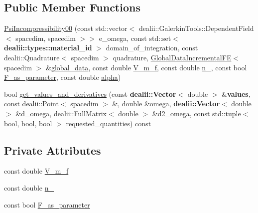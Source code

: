 \subsection*{Public Member Functions}
\begin{DoxyCompactItemize}
\item 
\hyperlink{classincremental_f_e_1_1_psi_incompressibility00_af5f686a8e2cf7aeb51ca959de9e32cb9}{Psi\+Incompressibility00} (const std\+::vector$<$ dealii\+::\+Galerkin\+Tools\+::\+Dependent\+Field$<$ spacedim, spacedim $>$$>$ e\+\_\+omega, const std\+::set$<$ {\bf dealii\+::types\+::material\+\_\+id} $>$ domain\+\_\+of\+\_\+integration, const dealii\+::\+Quadrature$<$ spacedim $>$ quadrature, \hyperlink{classincremental_f_e_1_1_global_data_incremental_f_e}{Global\+Data\+Incremental\+FE}$<$ spacedim $>$ \&\hyperlink{classincremental_f_e_1_1_psi_3_01spacedim_00_01spacedim_01_4_abf0a4804877fd7cc9bd1b90e52760ba9}{global\+\_\+data}, const double \hyperlink{classincremental_f_e_1_1_psi_incompressibility00_adb4a98d91d9105e56d71b1c2bbb731fe}{V\+\_\+m\+\_\+f}, const double \hyperlink{classincremental_f_e_1_1_psi_incompressibility00_a21e9fc511e9410d0fbc9d0514f801f69}{n\+\_}, const bool \hyperlink{classincremental_f_e_1_1_psi_incompressibility00_aca72a8996f35c7dbd664765af62dec95}{F\+\_\+as\+\_\+parameter}, const double \hyperlink{classincremental_f_e_1_1_psi_3_01spacedim_00_01spacedim_01_4_af7b8227188dbdd6ada35b9445d96c79d}{alpha})
\item 
bool \hyperlink{classincremental_f_e_1_1_psi_incompressibility00_a2a743cc84d7a5df0ac48b6ba52f15897}{get\+\_\+values\+\_\+and\+\_\+derivatives} (const {\bf dealii\+::\+Vector}$<$ double $>$ \&{\bf values}, const dealii\+::\+Point$<$ spacedim $>$ \&, double \&omega, {\bf dealii\+::\+Vector}$<$ double $>$ \&d\+\_\+omega, dealii\+::\+Full\+Matrix$<$ double $>$ \&d2\+\_\+omega, const std\+::tuple$<$ bool, bool, bool $>$ requested\+\_\+quantities) const 
\end{DoxyCompactItemize}
\subsection*{Private Attributes}
\begin{DoxyCompactItemize}
\item 
const double \hyperlink{classincremental_f_e_1_1_psi_incompressibility00_adb4a98d91d9105e56d71b1c2bbb731fe}{V\+\_\+m\+\_\+f}
\item 
const double \hyperlink{classincremental_f_e_1_1_psi_incompressibility00_a21e9fc511e9410d0fbc9d0514f801f69}{n\+\_}
\item 
const bool \hyperlink{classincremental_f_e_1_1_psi_incompressibility00_aca72a8996f35c7dbd664765af62dec95}{F\+\_\+as\+\_\+parameter}
\end{DoxyCompactItemize}


